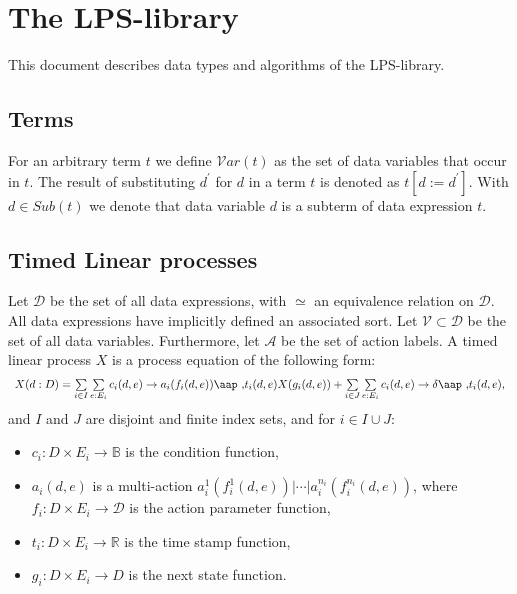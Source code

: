 \documentclass{article}
\begin{document}
\section{ The LPS-library}

This document describes data types and algorithms of the LPS-library.

\subsection{Terms}

For an arbitrary term $t$ we define $\mathcal{V}ar(t)$ as the set of data
variables that occur in $t$. The result of substituting $d^{\prime }$ for $d$
in a term $t$ is denoted as $t[d:=d^{\prime }]$. With $d\in Sub(t)$ we
denote that data variable $d$ is a subterm of data expression $t$.

\subsection{Timed Linear processes}

Let $\mathcal{D}$ be the set of all data expressions, with $\simeq $ an
equivalence relation on $\mathcal{D}$. All data expressions have implicitly
defined an associated sort. Let $\mathcal{V\subset D}$ be the set of all
data variables. Furthermore, let $\mathcal{A}$ be the set of action labels.
A timed linear process $X$ is a process equation of the following form:%
\begin{equation}
\begin{array}{l}
X(d:D)=\sum\limits_{i\in I}\sum\limits_{e:E_{i}}c_{i}(d,e)\rightarrow
a_{i}(f_{i}(d,e)) \mbox{\aap ,} t_{i}(d,e)X(g_{i}(d,e))+\sum\limits_{i\in
J}\sum\limits_{e:E_{i}}c_{i}(d,e)\rightarrow \delta \mbox{\aap ,} t_{i}(d,e),%
\end{array}
\label{eq:lps_timed}
\end{equation}%
and $I$ and $J$ are disjoint and finite index sets, and for $i\in I\cup J$:

\begin{itemize}
\item $c_{i}:D\times E_{i}\rightarrow \mathbb{B}$ is the condition function,

\item $a_{i}(d,e)$ is a multi-action $a_{i}^{1}(f_{i}^{1}(d,e))|\cdots
|a_{i}^{n_{i}}(f_{i}^{n_{i}}(d,e))$, where $f_{i}:D\times E_{i}\rightarrow 
\mathcal{D}$ is the action parameter function,

\item $t_{i}:D\times E_{i}\rightarrow \mathbb{R}$ is the time stamp function,

\item $g_{i}:D\times E_{i}\rightarrow D$ is the next state function.
\end{itemize}
\end{document}

